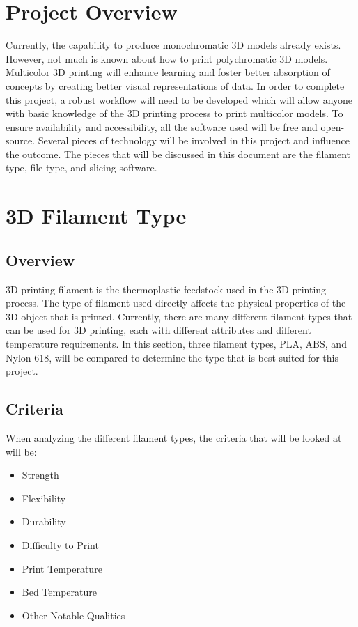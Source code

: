 \documentclass[letterpaper, onecolumn, draftclsnofoot,10pt, compsoc]{IEEEtran}
\begin{document}
\newpage
{}
\tableofcontents
\clearpage

\begin{singlespace}
\section{Project Overview} 
Currently, the capability to produce monochromatic 3D models already exists. 
However, not much is known about how to print polychromatic 3D models.
Multicolor 3D printing will enhance learning and foster better absorption of concepts by creating better visual representations of data. 
In order to complete this project, a robust workflow will need to be developed which will allow anyone with basic knowledge of the 3D printing process to print multicolor models.
To ensure availability and accessibility, all the software used will be free and open-source.
Several pieces of technology will be involved in this project and influence the outcome. 
The pieces that will be discussed in this document are the filament type, file type, and slicing software.


\section{3D Filament Type}
\subsection{Overview}
3D printing filament is the thermoplastic feedstock used in the 3D printing process.
The type of filament used directly affects the physical properties of the 3D object that is printed. 
Currently, there are many different filament types that can be used for 3D printing, each with different attributes and different temperature requirements.
In this section, three filament types, PLA, ABS, and Nylon 618, will be compared to determine the type that is best suited for this project. 
\subsection{Criteria}
When analyzing the different filament types, the criteria that will be looked at will be: 
\begin{itemize}
\item Strength
\item Flexibility
\item Durability
\item Difficulty to Print
\item Print Temperature
\item Bed Temperature
\item Other Notable Qualities
\end{itemize}

\end{singlespace}
\end{document}
